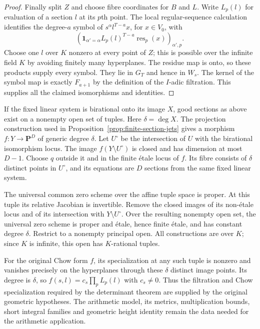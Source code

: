 \begin{proof}
Finally split $Z$ and choose fibre coordinates for $B$ and $L$.
Write $L_p(l)$ for evaluation of a section $l$ at its $p$th point.
The local regular-sequence calculation identifies the degree-$a$
symbol of $s^\alpha l^{T-a}x$, for $x\in V_0$, with
\[
       (\mathbf1_{\alpha'=\alpha}
                       L_p(l)^{T-a}\operatorname{res}_p(x))_{\alpha',p}.
\]
Choose one $l$ over $K$ nonzero at every point of $Z$; this is possible
over the infinite field $K$ by avoiding finitely many hyperplanes.
The residue map is
onto, so these products supply every symbol.  They lie in $G_T$ and
hence in $W_s$.  The kernel of the symbol map is exactly $F_{a+1}$
by the definition of the $I$-adic filtration.  This supplies all the
claimed isomorphisms and identities.
\end{proof}

If the fixed linear system is birational onto its image $X$, good
sections as above exist on a nonempty open set of tuples.  Here
$\delta=\deg X$.  The projection construction used in
Proposition~\ref{prop:finite-section-jets} gives a morphism
$f:Y\to\mathbf P^D$ of generic degree $\delta$.  Let $U^\circ$ be
the intersection of $U$ with the birational isomorphism locus.
The image $f(Y\setminus U^\circ)$ is closed and has dimension at most
$D-1$.  Choose $q$ outside it and in the finite \'etale locus of $f$.
Its fibre consists of $\delta$ distinct points in $U^\circ$, and
its equations are $D$ sections from the same fixed linear system.

The universal common zero scheme over the affine tuple space is
proper.  At this tuple its relative Jacobian is invertible.  Remove
the closed images of its non-\'etale locus and of its intersection
with $Y\setminus U^\circ$.  Over the resulting nonempty open set,
the universal zero scheme is proper and \'etale, hence finite
\'etale, and has constant degree $\delta$.  Restrict to a nonempty
principal open.  All constructions are over $K$; since $K$ is
infinite, this open has $K$-rational tuples.

For the original Chow form $f$, its specialization at any such tuple
is nonzero and vanishes precisely on the hyperplanes through these
$\delta$ distinct image points.  Its degree is $\delta$, so
$f(s,l)=c_s\prod_pL_p(l)$ with $c_s\ne0$.  Thus the filtration and
Chow specialization required by the determinant theorem are supplied
by the original geometric hypotheses.  The arithmetic model, its
metrics, multiplication bounds, short integral families and geometric
height identity remain the data needed for the arithmetic application.
